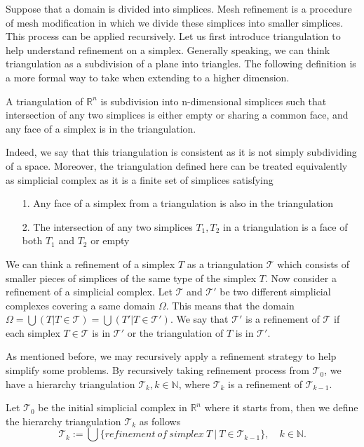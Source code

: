 Suppose that a domain is divided into simplices. Mesh refinement is a procedure of mesh modification in which we divide these simplices into smaller simplices. This process can be applied recursively. Let us first introduce triangulation to help understand refinement on a simplex. Generally speaking, we can think triangulation as a subdivision of a plane into triangles. The following definition is a more formal way to take when extending to a higher dimension.
    \begin{definition}
    A triangulation of $\mathbb R^n$ is subdivision into n-dimensional simplices such that intersection of any two simplices is either empty or sharing a common face, and any face of a simplex is in the triangulation.
    \end{definition}
    Indeed, we say that this triangulation is consistent as it is not simply subdividing of a space. Moreover, the triangulation defined here can be treated equivalently as simplicial complex as it is a finite set of simplices satisfying
    \begin{itemize}
        \item[1.] Any face of a simplex from a triangulation is also in the triangulation
        \item[2.] The intersection of any two simplices $T_1, T_2 $ in a triangulation is a face of both $T_1$ and  $T_2$ or empty
    \end{itemize}
    

    We can think a refinement of a simplex $T$ as a triangulation $\mathcal{T}$ which consists of smaller pieces of simplices of the same type of the simplex $T$. Now consider a refinement of a simplicial complex. Let $\mathcal{T}$ and $\mathcal{T'}$ be two different simplicial complexes covering a same domain $\Omega$. This means that the domain \(\Omega = \displaystyle \bigcup({T \vert T\in \mathcal{T}}) = \bigcup({T' \vert T\in \mathcal{T'}})\). We say that $\mathcal{T'}$ is a refinement of $\mathcal{T}$ if each simplex $T\in\mathcal{T}$ is in $\mathcal{T'}$ or the triangulation of $T$ is in $\mathcal{T'}$.

    As mentioned before, we may recursively apply a refinement strategy to help simplify some problems. By recursively taking refinement process from $\mathcal{T}_0$, we have a hierarchy triangulation $\mathcal{T}_k, k\in\mathbb{N}$, where $\mathcal{T}_k$ is a refinement of $\mathcal{T}_{k-1}$. 
    \begin{definition}
    Let $\mathcal{T}_0$ be the initial simplicial complex in $\mathbb{R}^n$ where it starts from, then we define the hierarchy triangulation $\mathcal{T}_k$ as follows
    \begin{equation*}
    \mathcal{T}_k := \bigcup\{refinement~of~simplex~T ~\vert ~T\in\mathcal{T}_{k-1}\}, \quad k\in\mathbb{N}.
    \end{equation*}
    \end{definition}

